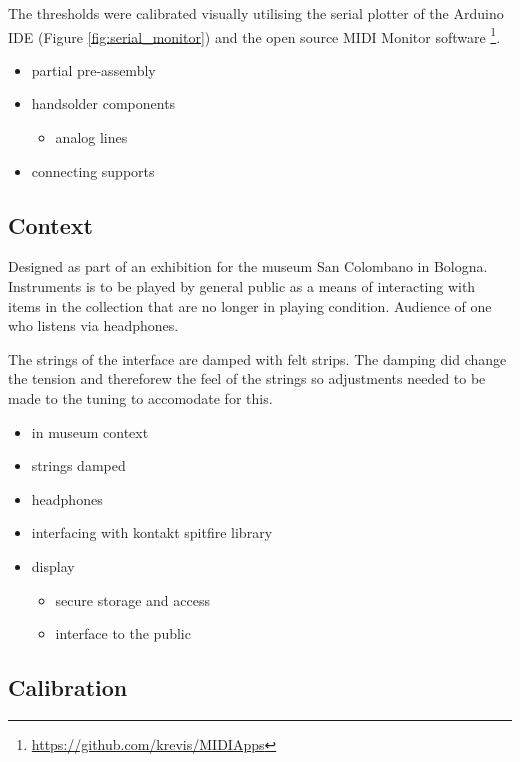 The thresholds were calibrated visually utilising the serial plotter of
the Arduino IDE (Figure \ref{fig:serial_monitor}) and the open source MIDI
Monitor software \footnote{\url{https://github.com/krevis/MIDIApps}}.

\begin{itemize}
\item
  partial pre-assembly
\item
  handsolder components

  \begin{itemize}
  \item
    analog lines
  \end{itemize}
\item
  connecting supports
\end{itemize}

\subsection{Context}\label{context}

Designed as part of an exhibition for the museum San Colombano in
Bologna. Instruments is to be played by general public as a means of
interacting with items in the collection that are no longer in playing
condition. Audience of one who listens via headphones.

The strings of the interface are damped with felt strips. The damping
did change the tension and thereforew the feel of the strings so
adjustments needed to be made to the tuning to accomodate for this.

\begin{itemize}
\item
  in museum context
\item
  strings damped
\item
  headphones
\item
  interfacing with kontakt spitfire library
\item
  display

  \begin{itemize}
  \item
    secure storage and access
  \item
    interface to the public
  \end{itemize}
\end{itemize}

\subsection{Calibration}\label{calibration}

